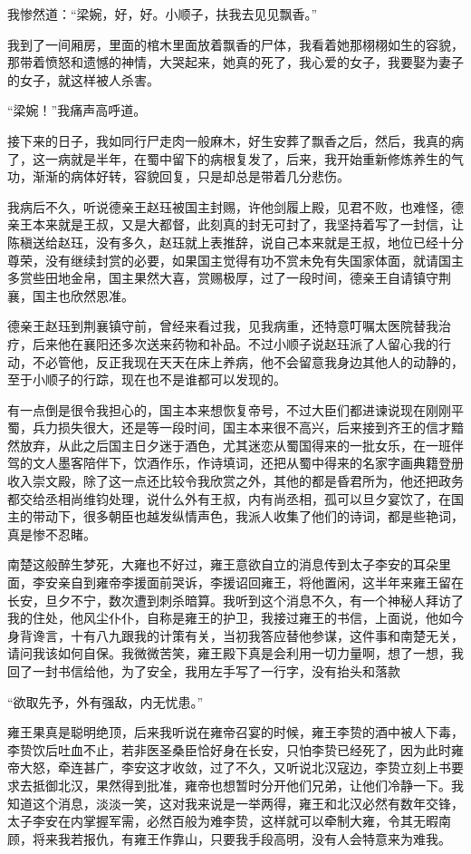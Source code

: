 我惨然道：“梁婉，好，好。小顺子，扶我去见见飘香。”

我到了一间厢房，里面的棺木里面放着飘香的尸体，我看着她那栩栩如生的容貌，那带着愤怒和遗憾的神情，大哭起来，她真的死了，我心爱的女子，我要娶为妻子的女子，就这样被人杀害。

“梁婉！”我痛声高呼道。

接下来的日子，我如同行尸走肉一般麻木，好生安葬了飘香之后，然后，我真的病了，这一病就是半年，在蜀中留下的病根复发了，后来，我开始重新修炼养生的气功，渐渐的病体好转，容貌回复，只是却总是带着几分悲伤。

我病后不久，听说德亲王赵珏被国主封赐，许他剑履上殿，见君不败，也难怪，德亲王本来就是王叔，又是大都督，此刻真的封无可封了，我坚持着写了一封信，让陈稹送给赵珏，没有多久，赵珏就上表推辞，说自己本来就是王叔，地位已经十分尊荣，没有继续封赏的必要，如果国主觉得有功不赏未免有失国家体面，就请国主多赏些田地金帛，国主果然大喜，赏赐极厚，过了一段时间，德亲王自请镇守荆襄，国主也欣然恩准。

德亲王赵珏到荆襄镇守前，曾经来看过我，见我病重，还特意叮嘱太医院替我治疗，后来他在襄阳还多次送来药物和补品。不过小顺子说赵珏派了人留心我的行动，不必管他，反正我现在天天在床上养病，他不会留意我身边其他人的动静的，至于小顺子的行踪，现在也不是谁都可以发现的。

有一点倒是很令我担心的，国主本来想恢复帝号，不过大臣们都进谏说现在刚刚平蜀，兵力损失很大，还是等一段时间，国主本来很不高兴，后来接到齐王的信才黯然放弃，从此之后国主日夕迷于酒色，尤其迷恋从蜀国得来的一批女乐，在一班伴驾的文人墨客陪伴下，饮酒作乐，作诗填词，还把从蜀中得来的名家字画典籍登册收入崇文殿，除了这一点还比较令我欣赏之外，其他的都是昏君所为，他还把政务都交给丞相尚维钧处理，说什么外有王叔，内有尚丞相，孤可以旦夕宴饮了，在国主的带动下，很多朝臣也越发纵情声色，我派人收集了他们的诗词，都是些艳词，真是惨不忍睹。

南楚这般醉生梦死，大雍也不好过，雍王意欲自立的消息传到太子李安的耳朵里面，李安亲自到雍帝李援面前哭诉，李援诏回雍王，将他置闲，这半年来雍王留在长安，旦夕不宁，数次遭到刺杀暗算。我听到这个消息不久，有一个神秘人拜访了我的住处，他风尘仆仆，自称是雍王的护卫，我接过雍王的书信，上面说，他如今身背谗言，十有八九跟我的计策有关，当初我答应替他参谋，这件事和南楚无关，请问我该如何自保。我微微苦笑，雍王殿下真是会利用一切力量啊，想了一想，我回了一封书信给他，为了安全，我用左手写了一行字，没有抬头和落款

“欲取先予，外有强敌，内无忧患。”

雍王果真是聪明绝顶，后来我听说在雍帝召宴的时候，雍王李贽的酒中被人下毒，李贽饮后吐血不止，若非医圣桑臣恰好身在长安，只怕李贽已经死了，因为此时雍帝大怒，牵连甚广，李安这才收敛，过了不久，又听说北汉寇边，李贽立刻上书要求去抵御北汉，果然得到批准，雍帝也想暂时分开他们兄弟，让他们冷静一下。我知道这个消息，淡淡一笑，这对我来说是一举两得，雍王和北汉必然有数年交锋，太子李安在内掌握军需，必然百般为难李贽，这样就可以牵制大雍，令其无暇南顾，将来我若报仇，有雍王作靠山，只要我手段高明，没有人会特意来为难我。

